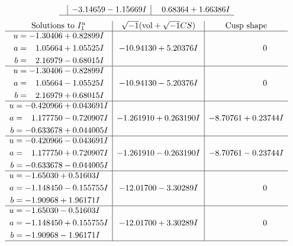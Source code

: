 \documentclass[1p]{elsarticle_modified}
\theoremstyle{definition}
\newcommand{\I}{\sqrt{-1}}
\begin{document}
$$\begin{array}{c|c|c}
 & -3.14659 - 1.15669 I & \phantom{-}0.68364 + 1.66386 I\\
 \hline 
 \end{array}$$\newpage$$\begin{array}{c|c|c}  
\text{Solutions to }I^u_{1}& \I (\text{vol} + \sqrt{-1}CS) & \text{Cusp shape}\\
 \hline 
\begin{aligned}
u &= -1.30406 + 0.82899 I \\
a &= \phantom{-}1.05664 + 1.05525 I \\
b &= \phantom{-}2.16979 - 0.68015 I\end{aligned}
 & -10.94130 + 5.20376 I & \phantom{-0.000000 } 0 \\ \hline\begin{aligned}
u &= -1.30406 - 0.82899 I \\
a &= \phantom{-}1.05664 - 1.05525 I \\
b &= \phantom{-}2.16979 + 0.68015 I\end{aligned}
 & -10.94130 - 5.20376 I & \phantom{-0.000000 } 0 \\ \hline\begin{aligned}
u &= -0.420966 + 0.043691 I \\
a &= \phantom{-}1.177750 - 0.720907 I \\
b &= -0.633678 + 0.044005 I\end{aligned}
 & -1.261910 + 0.263190 I & -8.70761 + 0.23744 I \\ \hline\begin{aligned}
u &= -0.420966 - 0.043691 I \\
a &= \phantom{-}1.177750 + 0.720907 I \\
b &= -0.633678 - 0.044005 I\end{aligned}
 & -1.261910 - 0.263190 I & -8.70761 - 0.23744 I \\ \hline\begin{aligned}
u &= -1.65030 + 0.51603 I \\
a &= -1.148450 - 0.155755 I \\
b &= -1.90968 + 1.96171 I\end{aligned}
 & -12.01700 - 3.30289 I & \phantom{-0.000000 } 0 \\ \hline\begin{aligned}
u &= -1.65030 - 0.51603 I \\
a &= -1.148450 + 0.155755 I \\
b &= -1.90968 - 1.96171 I\end{aligned}
 & -12.01700 + 3.30289 I & \phantom{-0.000000 } 0\\
 \hline 
 \end{array}$$\newpage\newpage\renewcommand{\arraystretch}{1}
\end{document}
